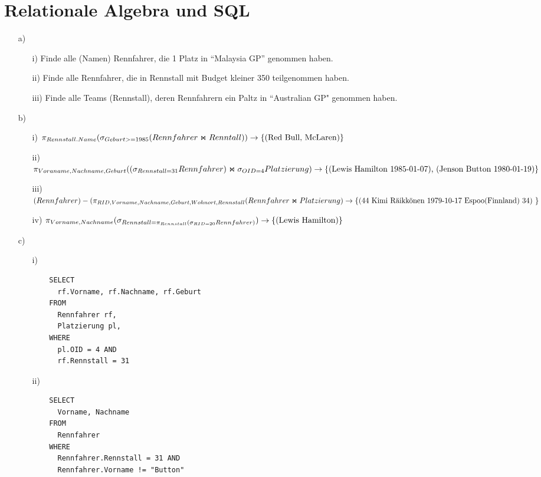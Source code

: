 \documentclass[a4paper,12pt]{scrartcl}
\begin{document}
\section{Relationale Algebra und SQL}
\begin{enumerate}
  \item[a)]
  \begin{enumerate}
   \item [i)] Finde alle (Namen) Rennfahrer, die 1 Platz in ``Malaysia GP'' genommen haben.
   \item[ii)] Finde alle Rennfahrer, die in Rennstall mit Budget kleiner 350 teilgenommen haben.
   \item[iii)] Finde alle Teams (Rennstall), deren Rennfahrern ein Paltz in ``Australian GP" genommen haben.
  \end{enumerate}
  \item[b)]
  \begin{enumerate}
  \item[i)] $\pi_{Rennstall.Name} (\sigma_{Geburt>=1985}(Rennfahrer \Join Renntall))
  \\ \rightarrow \text{\{(Red Bull, McLaren)\}}$
     
  \item[ii)] $\pi_{Voraname,Nachname,Geburt} ((\sigma_{Rennstall=31}Rennfahrer) \Join \sigma_{OID=4}Platzierung) 
   \\ \rightarrow \text{\{(Lewis Hamilton 1985-01-07), (Jenson Button 1980-01-19)\}}$
   
   \item[iii)] $(Rennfahrer)-(\pi_{RID,Vorname,Nachname,Geburt,Wohnort,Rennstall}(Rennfahrer \Join Platzierung)
   \\ \rightarrow \text{\{(44 Kimi R\"aikk\"onen 1979-10-17 Espoo(Finnland) 34) \}}$
   
   \item[iv)] $\pi_{Vorname,Nachname}(\sigma_{Rennstall=\pi_{Rennstall}(\sigma_{RID=20}Rennfahrer)})
   \\ \rightarrow \text{\{(Lewis Hamilton)\}}$
  \end{enumerate}
  \item[c)]
  \begin{enumerate}
   \item[i)] 
   \begin{verbatim}
    SELECT
      rf.Vorname, rf.Nachname, rf.Geburt
    FROM
      Rennfahrer rf,
      Platzierung pl,
    WHERE
      pl.OID = 4 AND
      rf.Rennstall = 31
   \end{verbatim}
   
   \item[ii)]
   \begin{verbatim}
    SELECT
      Vorname, Nachname
    FROM
      Rennfahrer
    WHERE
      Rennfahrer.Rennstall = 31 AND
      Rennfahrer.Vorname != "Button"
   \end{verbatim}
  \end{enumerate}
\end{enumerate}
\end{document}
